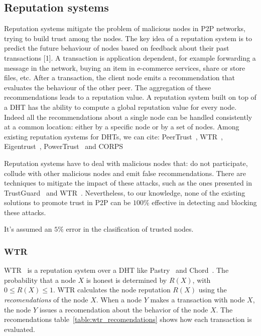 \subsection{Reputation systems}
Reputation systems mitigate the problem of malicious nodes in
P2P networks, trying to build trust among the nodes. The key
idea of a reputation system is to predict the future behaviour
of nodes based on feedback about their past transactions [1]. A
transaction is application dependent, for example forwarding a
message in the network, buying an item in e-commerce services,
share or store files, etc. After a transaction, the client node emits
a recommendation that evaluates the behaviour of the other peer.
The aggregation of these recommendations leads to a reputation
value.
A reputation system built on top of a DHT has the ability
to compute a global reputation value for every node. Indeed
all the recommendations about a single node can be handled
consistently at a common location: either by a specific node
or by a set of nodes. Among existing reputation systems for
DHTs, we can cite: PeerTrust~\cite{peertrust}, WTR~\cite{wtr},
Eigentrust~\cite{eigentrust},
PowerTrust~\cite{powertrust} and CORPS~\cite{corps}

Reputation systems have to deal with malicious nodes that:
do not participate, collude with other malicious nodes and
emit false recommendations. There are techniques to mitigate
the impact of these attacks, such as the ones presented in
TrustGuard~\cite{trustguard} and WTR~\cite{wtr}. Nevertheless, to our knowledge,
none of the existing solutions to promote trust in P2P can be
$100\%$ effective in detecting and blocking these attacks.

It's assumed an $5\%$ error in the clasification of trusted nodes.

\subsubsection{WTR}
\label{sec:wrt}
WTR~\cite{bonnaire2009wtr} is a reputation system over a DHT like Pastry~\cite{pastry} and
Chord~\cite{chord}. The probability that a node $X$ is honest is determined by
$R(X)$, with $0 \leq R(X) \leq 1$. WTR calculates the node reputation $R(X)$
using the \textit{recomendations} of the node $X$. When a node $Y$ makes a transaction with
node $X$, the node $Y$ issues a recomendation about the behavior of the node
$X$. The recomendations table~\ref{table:wtr_recomendations} shows how each
transaction is evaluated.
 
